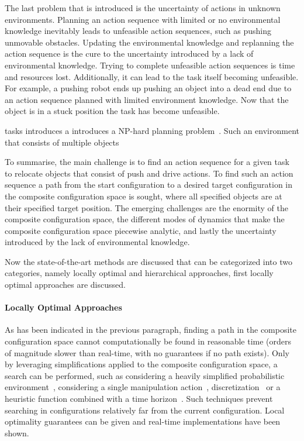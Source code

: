 The last problem that is introduced is the uncertainty of actions in unknown environments. Planning an action sequence with limited or no environmental knowledge inevitably leads to unfeasible action sequences, such as pushing unmovable obstacles. Updating the environmental knowledge and replanning the action sequence is the cure to the uncertainty introduced by a lack of environmental knowledge. Trying to complete unfeasible action sequences is time and resources lost. Additionally, it can lead to the task itself becoming unfeasible. For example, a pushing robot ends up pushing an object into a dead end due to an action sequence planned with limited environment knowledge. Now that the object is in a stuck position the task has become unfeasible.\bs
{}

tasks introduces a introduces a \ac{NP-hard} planning problem~\cite{wilfong_motion_1991}. Such an environment that consists of multiple objects

To summarise, the main challenge is to find an action sequence for a given task to relocate objects that consist of push and drive actions. To find such an action sequence a path from the start configuration to a desired target configuration in the composite configuration space is sought, where all specified objects are at their specified target position. The emerging challenges are the enormity of the composite configuration space, the different modes of dynamics that make the composite configuration space piecewise analytic, and lastly the uncertainty introduced by the lack of environmental knowledge.\bs

Now the state-of-the-art methods are discussed that can be categorized into two categories, namely locally optimal and hierarchical approaches, first locally optimal approaches are discussed.\bs

\paragraph{Locally Optimal Approaches}
As has been indicated in the previous paragraph, finding a path in the composite configuration space cannot computationally be found in reasonable time (orders of magnitude slower than real-time, with no guarantees if no path exists). Only by leveraging simplifications applied to the composite configuration space, a search can be performed, such as considering a heavily simplified probabilistic environment~\cite{vandenberg_path_2009}, considering a single manipulation action~\cite{berenson_manipulation_2009}, discretization~\cite{sabbaghnovin_optimal_2016} or a heuristic function combined with a time horizon~\cite{sabbaghnovin_optimal_2016}. Such techniques prevent searching in configurations relatively far from the current configuration. Local optimality guarantees can be given and real-time implementations have been shown.\bs

